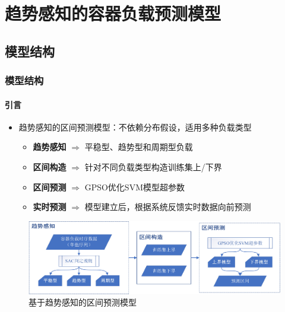 \section{趋势感知的容器负载预测模型}

\subsection{模型结构}

\begin{frame}
\frametitle{模型结构}
\framesubtitle{引言}
\begin{itemize}
    \item 趋势感知的区间预测模型：不依赖分布假设，适用多种负载类型
    \begin{itemize}
        \item \textbf{趋势感知} $\Rightarrow$ 平稳型、趋势型和周期型负载
        \item \textbf{区间构造} $\Rightarrow$ 针对不同负载类型构造训练集上/下界
        \item \textbf{区间预测} $\Rightarrow$ GPSO优化SVM模型超参数
        \item \textbf{实时预测} $\Rightarrow$ 模型建立后，根据系统反馈实时数据向前预测
    \end{itemize}
\end{itemize}
\begin{figure}[htb]
\centering
\includegraphics[scale=0.5]{figures/fig6_sac-gpso-svm.jpg}
\caption{基于趋势感知的区间预测模型}
\label{fig:fig6}
\end{figure}
\end{frame}

